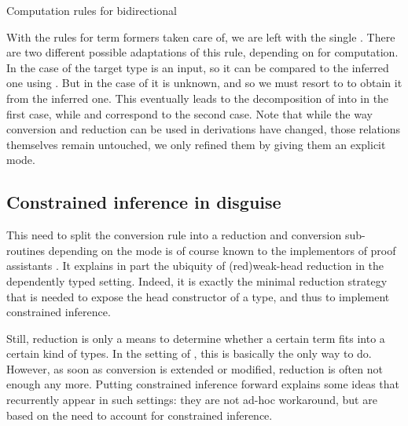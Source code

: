 \begin{marginfigure}
\ContinuedFloat
{}
\caption{Computation rules for bidirectional }
\label{fig:bidir-ccw-other}
\end{marginfigure}

With the rules for term formers taken care of,
we are left with the single .
There are two different possible adaptations of this rule, depending on
 for computation.
In the case of  the target type is an input, so
it can be compared to the inferred one using .
But in the case of  it is unknown, and so
we must resort to  to obtain it from the inferred one.
This eventually leads to the decomposition of  into
 in the first case, while
 and  correspond to the second case.
Note that while the way conversion and reduction can be used in derivations have changed,
those relations themselves remain untouched,
we only refined them by giving them an explicit mode.

\subsection{Constrained inference in disguise}

This need to split the conversion rule into a reduction and conversion sub-routines depending on the mode is of course known to the implementors of proof assistants .
It explains in part the ubiquity of \kl(red){weak-head} reduction
in the dependently typed setting.
Indeed, it is exactly the minimal reduction strategy that is needed to expose the
head constructor of a type, and thus to implement constrained inference.

Still, reduction is only a means to determine whether a certain term fits into
a certain kind of types. In the setting of , this is basically the only way to do.
However, as soon as conversion is extended or modified,
reduction is often not enough any more.
Putting constrained inference forward explains some ideas that recurrently appear in
such settings:  they are not ad-hoc workaround,
but are based on the need to account for constrained inference.

